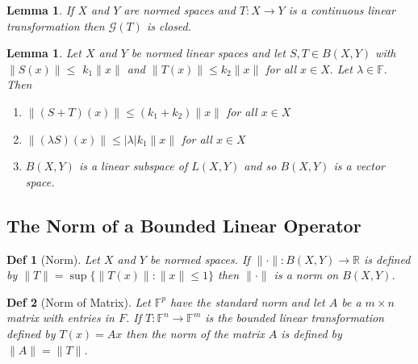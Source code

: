 \documentclass[10pt]{paper}
\newtheorem{definition}{Def}[section]
\newtheorem{lemma}[theorem]{Lemma}
\begin{document}
\begin{lemma}
    If $X$ and $Y$ are normed spaces and $T: X \rightarrow Y$ is a continuous linear transformation then $\mathcal{G}(T)$ is closed.
\end{lemma}

\begin{lemma}
    Let $X$ and $Y$ be normed linear spaces and let $S, T \in B(X, Y)$ with $\|S(x)\| \leq$ $k_{1}\|x\|$ and $\|T(x)\| \leq k_{2}\|x\|$ for all $x \in X .$ Let $\lambda \in \mathbb{F} .$ Then
    \begin{enumerate}
        \item $\|(S+T)(x)\| \leq\left(k_{1}+k_{2}\right)\|x\|$ for all $x \in X$
        \item $\|(\lambda S)(x)\| \leq|\lambda| k_{1}\|x\|$ for all $x \in X$
        \item $B(X, Y)$ is a linear subspace of $L(X, Y)$ and so $B(X, Y)$ is a vector space.
    \end{enumerate}
\end{lemma}

\subsection{The Norm of a Bounded Linear Operator}

\begin{definition}[Norm]
    Let $X$ and $Y$ be normed spaces. If $\|\cdot\|: B(X, Y) \rightarrow \mathbb{R}$ is defined by $ \|T\|=\sup \{\|T(x)\|:\|x\| \leq 1\} $ then $\|\cdot\|$ is a norm on $B(X, Y)$.
\end{definition}

\begin{definition}[Norm of Matrix]
    Let $\mathbb{F}^{p}$ have the standard norm and let $A$ be a $m \times n$ matrix with entries in $F$. If $T: \mathbb{F}^{n} \rightarrow \mathbb{F}^{m}$ is the bounded linear transformation defined by $T(x)=A x$ then the norm of the matrix $A$ is defined by $\|A\|=\|T\|$.
\end{definition}
\end{document}
